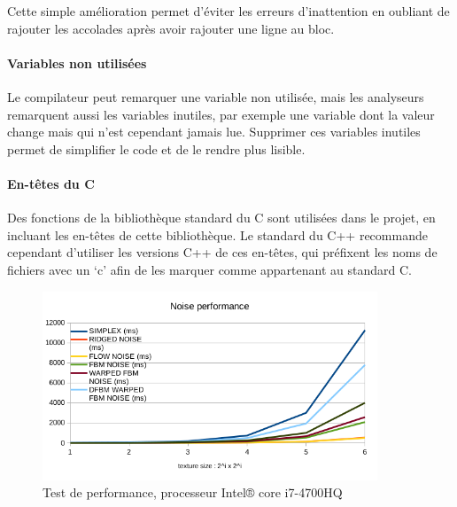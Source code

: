 Cette simple amélioration permet d'éviter les erreurs d'inattention en
oubliant de rajouter les accolades après avoir rajouter une ligne au
bloc.

\paragraph{Variables non utilisées}

Le compilateur peut remarquer une variable non utilisée, mais les
analyseurs remarquent aussi les variables inutiles, par exemple une
variable dont la valeur change mais qui n'est cependant jamais lue.
Supprimer ces variables inutiles permet de simplifier le code et de le
rendre plus lisible.

\paragraph{En-têtes du C}

Des fonctions de la bibliothèque standard du C sont utilisées dans le
projet, en incluant les en-têtes de cette bibliothèque. Le standard du
C++ recommande cependant d'utiliser les versions C++ de ces en-têtes,
qui préfixent les noms de fichiers avec un `c' afin de les marquer comme
appartenant au standard C.

\begin{figure}
    \centering
    \includegraphics[width=10cm]{img/noise-perf_i7-4700HQ.png}
    \caption{Test de performance, processeur Intel® core i7-4700HQ}
    \label{fig:bench}
\end{figure}
